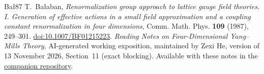 \documentclass[10pt,reqno]{amsart}
\theoremstyle{definition}
\theoremstyle{remark}
\numberwithin{equation}{section}
\numberwithin{figure}{section}
\begin{document}
\begin{thebibliography}{Ba{\l}87}
T.~Ba{\l}aban,
\emph{Renormalization group approach to lattice gauge field theories.
I. Generation of effective actions in a small field approximation
and a coupling constant renormalization in four dimensions},
Comm. Math. Phys. \textbf{109} (1987), 249--301.
\href{https://doi.org/10.1007/BF01215223}{doi:10.1007/BF01215223}.
\emph{Reading Notes on Four-Dimensional Yang--Mills Theory},
AI-generated working exposition, maintained by Zexi He, version of 13 November 2026,
Section~11 (exact blocking).
Available with these notes in the
\href{https://github.com/zexihe66-prog/4dym-reading-notes}{companion repository}.
\end{thebibliography}
\end{document}
